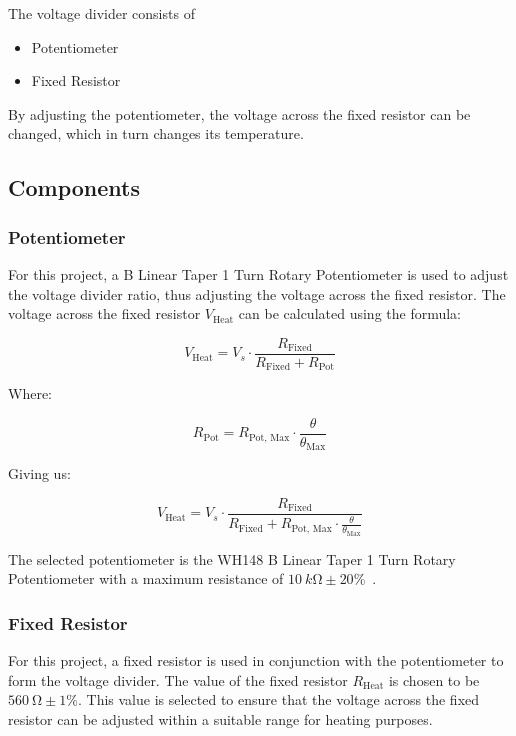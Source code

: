 \documentclass[12pt,a4paper]{article}
\begin{document}
The voltage divider consists of 
\begin{itemize}
    \item Potentiometer
    \item Fixed Resistor
\end{itemize} 
By adjusting the potentiometer, the voltage across the fixed resistor can be changed, which in turn changes its temperature.

\subsection{Components}
\subsubsection{Potentiometer}
For this project, a B Linear Taper 1 Turn Rotary Potentiometer is used to adjust the voltage divider ratio, thus adjusting the voltage across the fixed resistor. The voltage across the fixed resistor $V_{\text{Heat}}$ can be calculated using the formula:

\begin{equation*}
    V_{\text{Heat}} = V_s \cdot \frac{R_{\text{Fixed}}}{R_{\text{Fixed}} + R_{\text{Pot}}}
\end{equation*}

Where:

\begin{equation*}
    R_{\text{Pot}} = R_{\text{Pot, Max}} \cdot \frac{\theta}{\theta_{\text{Max}}}
\end{equation*}

Giving us:

\begin{equation}
    \label{eq:v-heat-theta}
    V_{\text{Heat}} = V_s \cdot \frac{R_{\text{Fixed}}}{R_{\text{Fixed}} + R_{\text{Pot, Max}} \cdot \frac{\theta}{\theta_{\text{Max}}}}
\end{equation}

The selected potentiometer is the WH148 B Linear Taper 1 Turn Rotary Potentiometer with a maximum resistance of $\SI{10}{k\ohm}\pm 20\%$~\cite{potentiometer}.

\subsubsection{Fixed Resistor}
For this project, a fixed resistor is used in conjunction with the potentiometer to form the voltage divider. The value of the fixed resistor $R_{\text{Heat}}$ is chosen to be $\SI{560}{\ohm}\pm 1\%$. This value is selected to ensure that the voltage across the fixed resistor can be adjusted within a suitable range for heating purposes.
\end{document}
